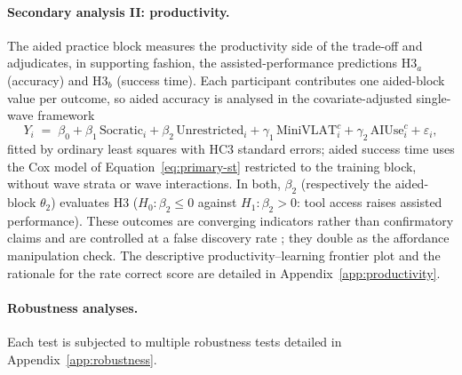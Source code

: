 \paragraph{Secondary analysis II: productivity.}
The aided practice block measures the productivity side of the trade-off and adjudicates, in supporting fashion, the assisted-performance predictions H3$_a$ (accuracy) and H3$_b$ (success time). Each participant contributes one aided-block value per outcome, so aided accuracy is analysed in the covariate-adjusted single-wave framework
\begin{equation}
Y_i \;=\; \beta_0 + \beta_1\,\mathrm{Socratic}_i + \beta_2\,\mathrm{Unrestricted}_i + \gamma_1\,\mathrm{MiniVLAT}^{c}_i + \gamma_2\,\mathrm{AIUse}^{c}_i + \varepsilon_i,
\label{eq:productivity}
\end{equation}
fitted by ordinary least squares with HC3 standard errors; aided success time uses the Cox model of Equation~\eqref{eq:primary-st} restricted to the training block, without wave strata or wave interactions. In both, $\beta_2$ (respectively the aided-block $\theta_2$) evaluates H3 ($H_0\colon \beta_2 \le 0$ against $H_1\colon \beta_2 > 0$: tool access raises assisted performance). These outcomes are converging indicators rather than confirmatory claims and are controlled at a false discovery rate \parencite{benjamini1995}; they double as the affordance manipulation check. The descriptive productivity--learning frontier plot and the rationale for the rate correct score are detailed in Appendix~\ref{app:productivity}.

\paragraph{Robustness analyses.}
Each test is subjected to multiple robustness tests detailed in Appendix~\ref{app:robustness}.

